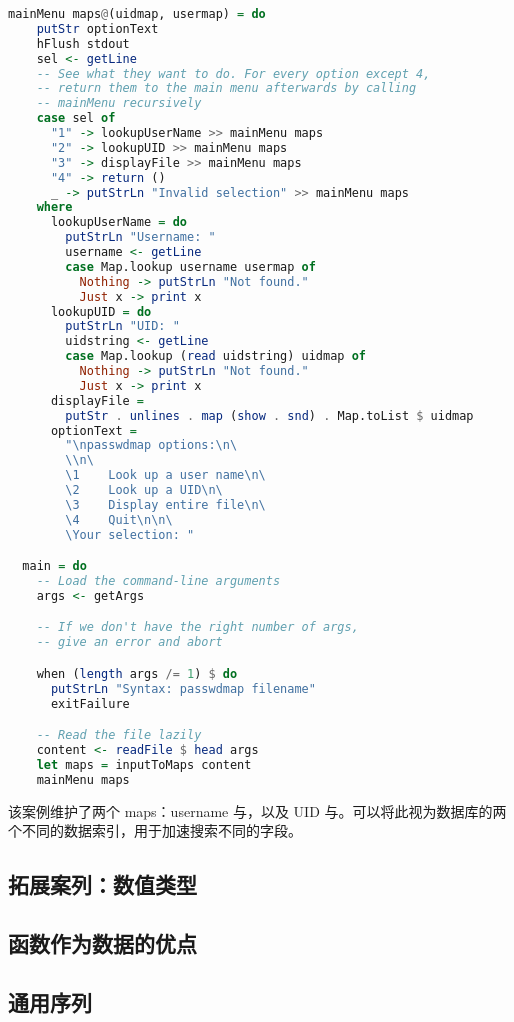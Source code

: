 \documentclass[./main.tex]{subfiles}
\begin{document}
\begin{lstlisting}[language=Haskell]
  mainMenu maps@(uidmap, usermap) = do
    putStr optionText
    hFlush stdout
    sel <- getLine
    -- See what they want to do. For every option except 4,
    -- return them to the main menu afterwards by calling
    -- mainMenu recursively
    case sel of
      "1" -> lookupUserName >> mainMenu maps
      "2" -> lookupUID >> mainMenu maps
      "3" -> displayFile >> mainMenu maps
      "4" -> return ()
      _ -> putStrLn "Invalid selection" >> mainMenu maps
    where
      lookupUserName = do
        putStrLn "Username: "
        username <- getLine
        case Map.lookup username usermap of
          Nothing -> putStrLn "Not found."
          Just x -> print x
      lookupUID = do
        putStrLn "UID: "
        uidstring <- getLine
        case Map.lookup (read uidstring) uidmap of
          Nothing -> putStrLn "Not found."
          Just x -> print x
      displayFile =
        putStr . unlines . map (show . snd) . Map.toList $ uidmap
      optionText =
        "\npasswdmap options:\n\
        \\n\
        \1    Look up a user name\n\
        \2    Look up a UID\n\
        \3    Display entire file\n\
        \4    Quit\n\n\
        \Your selection: "

  main = do
    -- Load the command-line arguments
    args <- getArgs

    -- If we don't have the right number of args,
    -- give an error and abort

    when (length args /= 1) $ do
      putStrLn "Syntax: passwdmap filename"
      exitFailure

    -- Read the file lazily
    content <- readFile $ head args
    let maps = inputToMaps content
    mainMenu maps
\end{lstlisting}

该案例维护了两个 maps：username 与，以及 UID 与。可以将此视为数据库的两个不同的数据索引，用于加速搜索不同的字段。

\subsection*{拓展案列：数值类型}

\subsection*{函数作为数据的优点}

\subsection*{通用序列}
\end{document}

